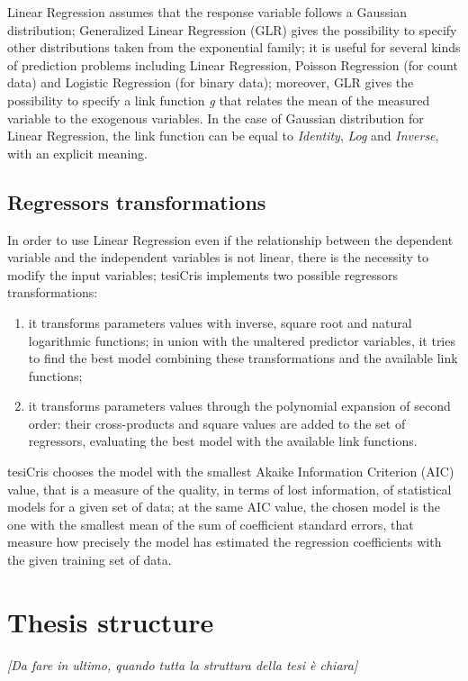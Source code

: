 Linear Regression assumes that the response variable follows a Gaussian distribution; Generalized Linear Regression (GLR) gives the possibility to specify other distributions taken from the exponential family; it is useful for several kinds of prediction problems including Linear Regression, Poisson Regression (for count data) and Logistic Regression (for binary data); moreover, GLR gives the possibility to specify a link function \textit{g} that relates the mean of the measured variable to the exogenous variables. In the case of Gaussian distribution for Linear Regression, the link function can be equal to \textit{Identity}, \textit{Log} and \textit{Inverse}, with an explicit meaning.


\subsection{Regressors transformations}\label{regrTransforms}

In order to use Linear Regression even if the relationship between the dependent variable and the independent variables is not linear, there is the necessity to modify the input variables; tesiCris implements two possible regressors transformations:

\begin{enumerate}

    \item it transforms parameters values with inverse, square root and natural logarithmic functions; in union with the unaltered predictor variables, it tries to find the best model combining these transformations and the available link functions;
    
    \item it transforms parameters values through the polynomial expansion of second order: their cross-products and square values are added to the set of regressors, evaluating the best model with the available link functions.

\end{enumerate}

tesiCris chooses the model with the smallest Akaike Information Criterion (AIC) value, that is a measure of the quality, in terms of lost information, of statistical models for a given set of data; at the same AIC value, the chosen model is the one with the smallest mean of the sum of coefficient standard errors, that measure how precisely the model has estimated the regression coefficients with the given training set of data.




\section{Thesis structure}

\textit{ [Da fare in ultimo, quando tutta la struttura della tesi è chiara] }
